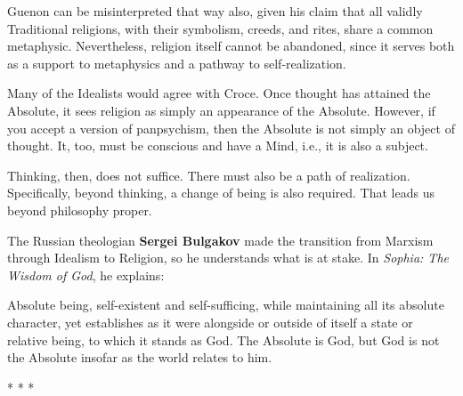 Guenon can be misinterpreted that way also, given his claim that all validly Traditional religions, with their symbolism, creeds, and rites, share a common metaphysic. Nevertheless, religion itself cannot be abandoned, since it serves both as a support to metaphysics and a pathway to self-realization.

Many of the Idealists would agree with Croce. Once thought has attained the Absolute, it sees religion as simply an appearance of the Absolute. However, if you accept a version of panpsychism, then the Absolute is not simply an object of thought. It, too, must be conscious and have a Mind, i.e., it is also a subject.

Thinking, then, does not suffice. There must also be a path of realization. Specifically, beyond thinking, a change of being is also required. That leads us beyond philosophy proper.

The Russian theologian \textbf{Sergei Bulgakov} made the transition from Marxism through Idealism to Religion, so he understands what is at stake. In \emph{Sophia: The Wisdom of God}, he explains:

\begin{quotex}
Absolute being, self-existent and self-sufficing, while maintaining all its absolute character, yet establishes as it were alongside or outside of itself a state or relative being, to which it stands as God. The Absolute is God, but God is not the Absolute insofar as the world relates to him.
\end{quotex}



\begin{center}* * *\end{center}

